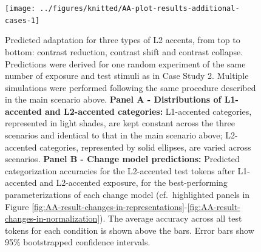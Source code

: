 \documentclass[
  11pt,
  man,floatsintext]{apa6}
\begin{document}
\begin{figure}

{\centering \texttt{[image: ../figures/knitted/AA-plot-results-additional-cases-1]} 

}

\caption{Predicted adaptation for three types of L2 accents, from top to bottom: contrast reduction, contrast shift and contrast collapse. Predictions were derived for one random experiment of the same number of exposure and test stimuli as in Case Study 2. Multiple simulations were performed following the same procedure described in the main scenario above. \textbf{Panel A - Distributions of L1-accented and L2-accented categories:} L1-accented categories, represented in light shades, are kept constant across the three scenarios and identical to that in the main scenario above; L2-accented categories, represented by solid ellipses, are varied across scenarios. \textbf{Panel B - Change model predictions:} Predicted categorization accuracies for the L2-accented test tokens after L1-accented and L2-accented exposure, for the best-performing parameterizations of each change model (cf.~highlighted panels in Figure \ref{fig:AA-result-changes-in-representations}-\ref{fig:AA-result-changes-in-normalization}). The average accuracy across all test tokens for each condition is shown above the bars. Error bars show 95\% bootstrapped confidence intervals.}\label{fig:AA-plot-results-additional-cases}
\end{figure}

\begin{table}

\caption{\label{tab:AA-table-best-performing-parameterization}Best-performing parameterizations across different accent scenarios. Recall that best-performing here refers to the parameterization that achieves the highest accuracy on L2-accented test tokens, rather than best quantitative fit against human data (which we do not have).}
\centering
{}
\end{table}
\end{document}
